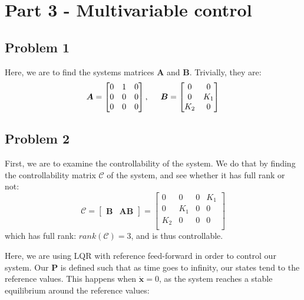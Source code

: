 \section{Part 3 - Multivariable control}
\subsection{Problem 1}
Here, we are to find the systems matrices $\boldsymbol{A}$ and $\boldsymbol{B}$. Trivially, they are:
\begin{equation}
  \boldsymbol{A} = \begin{bmatrix}
    0 & 1 & 0 \\
    0 & 0 & 0 \\
    0 & 0 & 0 \\
  \end{bmatrix}, \hspace{0.5cm}
  \boldsymbol{B} = \begin{bmatrix}
    0 & 0 \\
    0 & K_1 \\
    K_2 & 0 \\
  \end{bmatrix}
\end{equation}

\subsection{Problem 2}
First, we are to examine the controllability of the system. We do that by finding the controllability matrix $\boldsymbol{\mathcal{C}}$ of the system, and see whether it has full rank or not:
\begin{equation}
  \boldsymbol{\mathcal{C}} = \begin{bmatrix}
    \boldsymbol{B} & \boldsymbol{AB}
  \end{bmatrix}
  =
  \begin{bmatrix}
    0 & 0 & 0 & K_1 \\
    0 & K_1 & 0 & 0 \\
    K_2 & 0 & 0 & 0 \\
  \end{bmatrix}
\end{equation}
which has full rank: $rank(\boldsymbol{\mathcal{C}}) = 3$, and is thus
controllable.

Here, we are using LQR with reference feed-forward in order to control
our system. Our $\boldsymbol{P}$ is defined such that as time goes to
infinity, our states tend to the reference values. This happens when
$\dot{\boldsymbol{x}} = 0$, as the system reaches a stable equilibrium
around the reference values:

